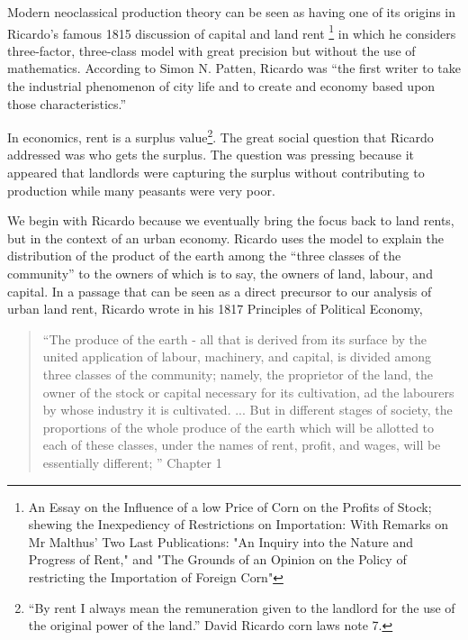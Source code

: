 Modern neoclassical production theory can be seen as having one of its origins in Ricardo's famous 1815 discussion of capital and  land rent \footnote{An Essay on the Influence of a low Price of Corn on the Profits of Stock; shewing the Inexpediency of Restrictions on Importation: With Remarks on Mr Malthus' Two Last Publications: "An Inquiry into the Nature and Progress of Rent," and "The Grounds of an Opinion on the Policy of restricting the Importation of Foreign Corn"} in which he considers three-factor, three-class model with great precision but without the use of mathematics.   According to Simon N. Patten, 
Ricardo was ``the first writer to take the industrial phenomenon of city life and to create and economy based upon those characteristics.'' 

In economics, rent is a surplus value\footnote{``By rent I always mean the remuneration given to the landlord for the use of the original power of the land.'' David Ricardo corn laws note 7.}. The great social question that Ricardo addressed  was who gets the surplus.  The question was pressing because it appeared that landlords were capturing the surplus without contributing to production while many peasants were very poor. 

 
We begin with Ricardo because we eventually bring the focus back to land rents, but in the context of an urban economy. Ricardo uses the model to explain the distribution of the product of the earth among the “three classes of the community”  to the owners of which is to say, the owners of land, labour, and capital. In a passage that can be seen as a direct precursor to our analysis of urban land rent, Ricardo  wrote in his 1817 Principles of Political Economy,

\begin{quotation}   
 “The produce of the earth - all that is derived from its surface by the united application of labour, machinery, and capital, is divided among three classes of the community; namely, the proprietor of the land, the owner of the stock or capital necessary for its cultivation, ad the labourers by whose industry it is cultivated. ...  But in different stages of society, the proportions of the whole produce of the earth which will be allotted to 
each of these classes, under the names of rent, profit, and wages, will be essentially different; ”  Chapter 1
\end{quotation}



